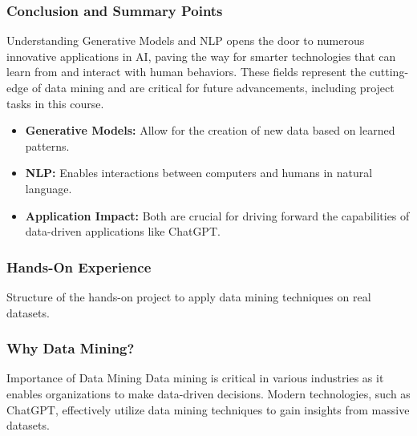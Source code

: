 \documentclass[aspectratio=169]{beamer}
\begin{document}
\begin{frame}
    \frametitle{Conclusion and Summary Points}
    Understanding Generative Models and NLP opens the door to numerous innovative applications in AI, paving the way for smarter technologies that can learn from and interact with human behaviors. 
    These fields represent the cutting-edge of data mining and are critical for future advancements, including project tasks in this course.
    
    \begin{itemize}
        \item \textbf{Generative Models:} Allow for the creation of new data based on learned patterns.
        \item \textbf{NLP:} Enables interactions between computers and humans in natural language.
        \item \textbf{Application Impact:} Both are crucial for driving forward the capabilities of data-driven applications like ChatGPT.
    \end{itemize}
\end{frame}

\begin{frame}
    \frametitle{Hands-On Experience}
    Structure of the hands-on project to apply data mining techniques on real datasets.
\end{frame}

\begin{frame}
    \frametitle{Why Data Mining?}
    \begin{block}{Importance of Data Mining}
        Data mining is critical in various industries as it enables organizations to make data-driven decisions. 
        Modern technologies, such as ChatGPT, effectively utilize data mining techniques to gain insights from massive datasets.
    \end{block}
\end{frame}
\end{document}
